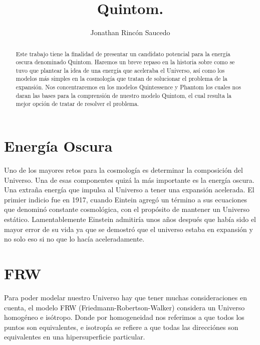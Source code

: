 \documentclass{article}
\title{Quintom.}
\author{Jonathan Rinc\'on Saucedo}
\begin{document}
\maketitle

  
    \maketitle
    \begin{abstract}
    Este trabajo tiene la finalidad de presentar un candidato potencial para la energ\'ia oscura denominado Quintom. Haremos un breve repaso en la historia sobre como se tuvo que plantear la idea de una energ\'ia que aceleraba el Universo, as\'i como los modelos m\'as simples en la cosmolog\'ia que tratan de solucionar el problema de la expansi\'on. Nos concentraremos en los modelos Quintessence y Phantom los cuales nos daran las bases para la comprensi\'on de nuestro modelo Quintom, el cual resulta la mejor opci\'on de tratar de resolver el problema.
    \end{abstract}



\section*{Energ\'ia Oscura} 
Uno de los mayores retos para la cosmolog\'ia es determinar la composici\'on del Universo. Una de esas componentes quiz\'a la m\'as importante es la energ\'ia oscura.
Una extra\~na energ\'ia que impulsa al Universo a tener una expansi\'on acelerada.
El primier indicio fue en 1917, cuando Eintein agreg\'o un t\'ermino a sus ecuaciones que denomin\'o constante cosmol\'ogica, con el prop\'osito de mantener un Universo est\'atico. Lamentablemente Einstein admitir\'ia unos a\~nos despu\'es que hab\'ia sido el mayor error de su vida ya que se demostr\'o que el universo estaba en expansi\'on y no solo eso si no que lo hac\'ia aceleradamente.  


\section*{FRW}
Para poder modelar nuestro Universo hay que tener muchas consideraciones en cuenta, el modelo FRW (Friedmann-Robertson-Walker) considera un Universo homog\'eneo e is\'otropo. 
Donde por homogeneidad nos referimos a que todos los puntos son equivalentes, e isotrop\'ia se refiere a que todas las direcci\'ones son equivalentes en una hipersuperficie particular. 
\end{document}

